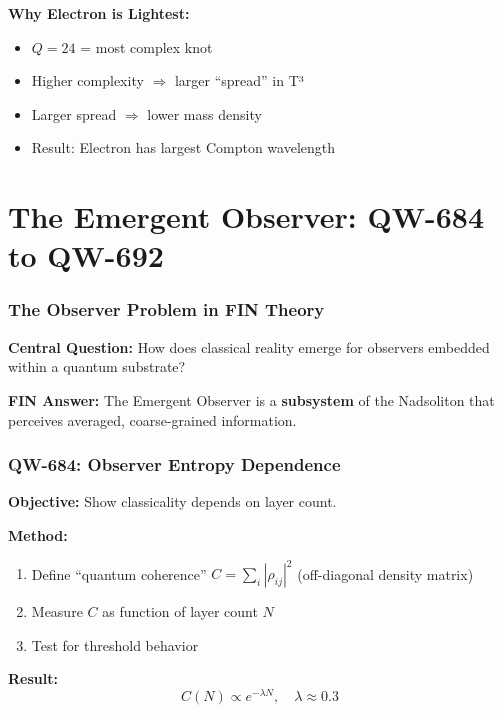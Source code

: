 \documentclass[11pt, a4paper]{article}
\theoremstyle{remark}
\begin{document}
\textbf{Why Electron is Lightest:}
\begin{itemize}
    \item $Q = 24$ = most complex knot
    \item Higher complexity $\Rightarrow$ larger ``spread'' in T³
    \item Larger spread $\Rightarrow$ lower mass density
    \item Result: Electron has largest Compton wavelength
\end{itemize}

\part{The Emergent Observer: QW-684 to QW-692}

\section{The Observer Problem in FIN Theory}

\textbf{Central Question:} How does classical reality emerge for observers embedded within a quantum substrate?

\textbf{FIN Answer:} The Emergent Observer is a \textbf{subsystem} of the Nadsoliton that perceives averaged, coarse-grained information.

\section{QW-684: Observer Entropy Dependence}

\textbf{Objective:} Show classicality depends on layer count.

\textbf{Method:}
\begin{enumerate}
    \item Define ``quantum coherence'' $C = \sum_i |\rho_{ij}|^2$ (off-diagonal density matrix)
    \item Measure $C$ as function of layer count $N$
    \item Test for threshold behavior
\end{enumerate}

\textbf{Result:}
\begin{equation}
C(N) \propto e^{-\lambda N}, \quad \lambda \approx 0.3
\end{equation}
\end{document}
